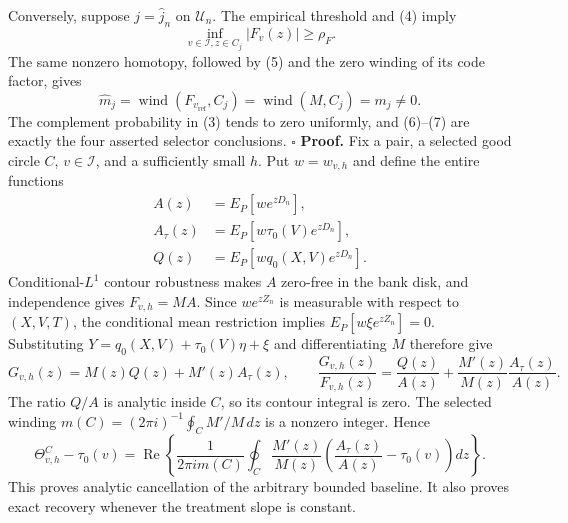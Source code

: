 Conversely, suppose \(j=\widehat j_n\) on \(\mathcal U_n\).  The empirical threshold and (4) imply
\[
 \inf_{v\in\mathcal I,z\in C_j}|F_v(z)|\ge\rho_F. \tag{6}
\]
The same nonzero homotopy, followed by (5) and the zero winding of its code factor, gives
\[
 \widehat m_j
 =\operatorname{wind}(F_{v_{\mathrm{ref}}},C_j)
 =\operatorname{wind}(M,C_j)=m_j\ne0. \tag{7}
\]
The complement probability in (3) tends to zero uniformly, and (6)--(7) are exactly the four asserted selector conclusions. \(\square\)
\textbf{Proof.}
Fix a pair, a selected good circle \(C\), \(v\in\mathcal I\), and a sufficiently small \(h\).  Put \(w=w_{v,h}\) and define the entire functions
\[
 \begin{aligned}
 A(z)&=E_P[we^{zD_n}],\\
 A_\tau(z)&=E_P[w\tau_0(V)e^{zD_n}],\\
 Q(z)&=E_P[wq_0(X,V)e^{zD_n}].
 \end{aligned} \tag{1}
\]
Conditional-\(L^1\) contour robustness makes \(A\) zero-free in the bank disk, and independence gives \(F_{v,h}=MA\).  Since \(we^{zZ_n}\) is measurable with respect to \((X,V,T)\), the conditional mean restriction implies
\(E_P[w\xi e^{zZ_n}]=0\).  Substituting
\(Y=q_0(X,V)+\tau_0(V)\eta+\xi\) and differentiating \(M\) therefore give
\[
 G_{v,h}(z)=M(z)Q(z)+M'(z)A_\tau(z),
 \qquad
 \frac{G_{v,h}(z)}{F_{v,h}(z)}
 =\frac{Q(z)}{A(z)}+\frac{M'(z)}{M(z)}\frac{A_\tau(z)}{A(z)}. \tag{2}
\]
The ratio \(Q/A\) is analytic inside \(C\), so its contour integral is zero.  The selected winding
\(m(C)=(2\pi i)^{-1}\oint_C M'/M\,dz\) is a nonzero integer.  Hence
\[
 \Theta^C_{v,h}-\tau_0(v)
 =\operatorname{Re}\left\{
 \frac1{2\pi i m(C)}\oint_C\frac{M'(z)}{M(z)}
 \left(\frac{A_\tau(z)}{A(z)}-\tau_0(v)\right)dz
 \right\}. \tag{3}
\]
This proves analytic cancellation of the arbitrary bounded baseline.  It also proves exact recovery whenever the treatment slope is constant.

